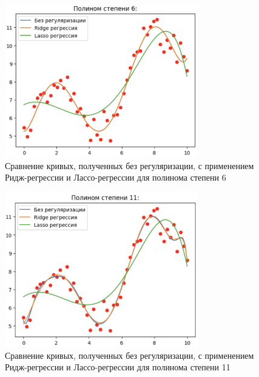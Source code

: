 \begin{figure}
	\begin{center}
		\includegraphics[width=0.75\textwidth]{images/5.png}
	\end{center}
	\caption{Сравнение кривых, полученных без регуляризации, с применением Ридж-регрессии и Лассо-регрессии для полинома степени 6}
	\label{img:5}
\end{figure}

\begin{figure}
	\begin{center}
		\includegraphics[width=0.75\textwidth]{images/6.png}
	\end{center}
	\caption{Сравнение кривых, полученных без регуляризации, с применением Ридж-регрессии и Лассо-регрессии для полинома степени 11}
	\label{img:6}
\end{figure}

